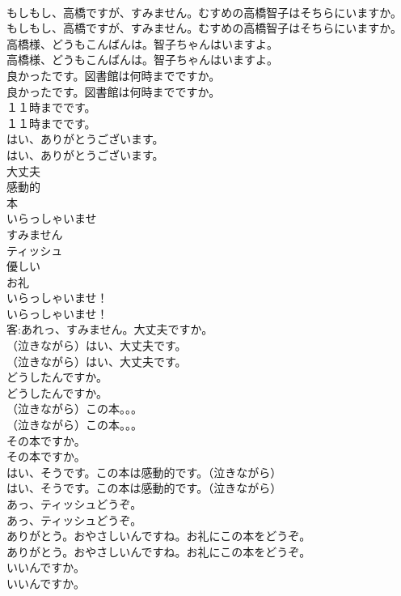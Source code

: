 \documentclass[8pt]{extreport}
\begin{document}
\begin{CJK}{UTF8}{min}
\\	もしもし、高橋ですが、すみません。むすめの高橋智子はそちらにいますか。	
\\	もしもし、高橋ですが、すみません。むすめの高橋智子はそちらにいますか。 
\\	高橋様、どうもこんばんは。智子ちゃんはいますよ。	
\\	高橋様、どうもこんばんは。智子ちゃんはいますよ。 
\\	良かったです。図書館は何時までですか。	
\\	良かったです。図書館は何時までですか。 
\\	１１時までです。	
\\	１１時までです。 
\\	はい、ありがとうございます。	
\\	はい、ありがとうございます。 
\\	大丈夫
\\	感動的
\\	本
\\	いらっしゃいませ
\\	すみません
\\	ティッシュ
\\	優しい
\\	お礼
\\	いらっしゃいませ！	
\\	いらっしゃいませ！ 
\\	客:あれっ、すみません。大丈夫ですか。	
\\	（泣きながら）はい、大丈夫です。	
\\	（泣きながら）はい、大丈夫です。 
\\	どうしたんですか。	
\\	どうしたんですか。 
\\	（泣きながら）この本。。。	
\\	（泣きながら）この本。。。 
\\	その本ですか。	
\\	その本ですか。 
\\	はい、そうです。この本は感動的です。（泣きながら）	
\\	はい、そうです。この本は感動的です。（泣きながら） 
\\	あっ、ティッシュどうぞ。	
\\	あっ、ティッシュどうぞ。 
\\	ありがとう。おやさしいんですね。お礼にこの本をどうぞ。	
\\	ありがとう。おやさしいんですね。お礼にこの本をどうぞ。 
\\	いいんですか。	
\\	いいんですか。 

\end{CJK}
\end{document}
